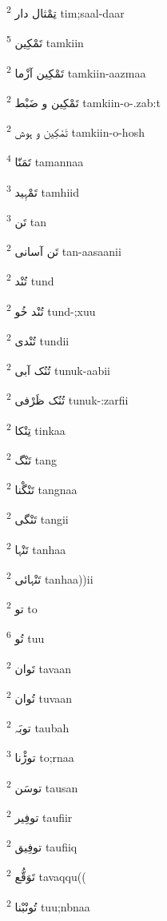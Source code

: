 \documentclass[12pt]{article}
\begin{document}
\begin{multicols}{5}
{\ur تِمْثال دار}   \textsuperscript{2} tim;saal-daar

{\ur تَمْکِین}   \textsuperscript{5} tamkiin

{\ur تَمْکِین آزْما}   \textsuperscript{2} tamkiin-aazmaa

{\ur تَمْکِین و ضَبْط}   \textsuperscript{2} tamkiin-o-.zab:t

{\ur تَمْکِین و ہوش}   \textsuperscript{2} tamkiin-o-hosh

{\ur تَمَنّا}   \textsuperscript{4} tamannaa

{\ur تَمْہِید}   \textsuperscript{3} tamhiid

{\ur تَن}   \textsuperscript{3} tan

{\ur تَن آسانی}   \textsuperscript{2} tan-aasaanii

{\ur تُنْد}   \textsuperscript{2} tund

{\ur تُنْد خُو}   \textsuperscript{2} tund-;xuu

{\ur تُنْدی}   \textsuperscript{2} tundii

{\ur تُنُک آبی}   \textsuperscript{2} tunuk-aabii

{\ur تُنُک ظَرْفی}   \textsuperscript{2} tunuk-:zarfii

{\ur تِنْکا}   \textsuperscript{2} tinkaa

{\ur تَنْگ}   \textsuperscript{2} tang

{\ur تَنْگْنا}   \textsuperscript{2} tangnaa

{\ur تَنْگی}   \textsuperscript{2} tangii

{\ur تَنْہا}   \textsuperscript{2} tanhaa

{\ur تَنْہائی}   \textsuperscript{2} tanhaa))ii

{\ur تو}   \textsuperscript{2} to

{\ur تُو}   \textsuperscript{6} tuu

{\ur تَوان}   \textsuperscript{2} tavaan

{\ur تُوان}   \textsuperscript{2} tuvaan

{\ur توبَہ}   \textsuperscript{2} taubah

{\ur توڑْنا}   \textsuperscript{3} to;rnaa

{\ur توسَن}   \textsuperscript{2} tausan

{\ur توفِیر}   \textsuperscript{2} taufiir

{\ur توفِیق}   \textsuperscript{2} taufiiq

{\ur تَوَقُّع}   \textsuperscript{2} tavaqqu((

{\ur تُونْبْنا}   \textsuperscript{2} tuu;nbnaa


\end{multicols}
\end{document}

